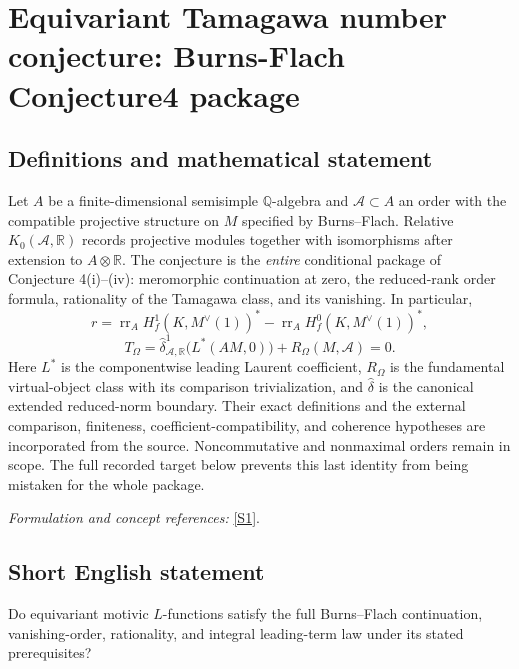 \documentclass[11pt]{article}
\begin{document}
\section*{\texorpdfstring{Equivariant Tamagawa number conjecture: Burns-Flach Conjecture4 package}{Equivariant Tamagawa number conjecture: Burns-Flach Conjecture4 package}}\label{statement}
\subsection{Definitions and mathematical statement}
Let $A$ be a finite-dimensional semisimple ${\mathbb{Q}}$-algebra and $\mathcal A\subset A$ an order with the compatible projective structure on $M$ specified by Burns--Flach. Relative $K_0(\mathcal A,{\mathbb{R}})$ records projective modules together with isomorphisms after extension to $A\otimes{\mathbb{R}}$. The conjecture is the \emph{entire} conditional package of Conjecture 4(i)--(iv): meromorphic continuation at zero, the reduced-rank order formula, rationality of the Tamagawa class, and its vanishing. In particular,
\[
 r=\operatorname{rr}_A H_f^1(K,M^\vee(1))^*
   -\operatorname{rr}_A H_f^0(K,M^\vee(1))^*,
\]
\[
 T_\Omega=\widehat\delta^1_{\mathcal A,{\mathbb{R}}}\bigl(L^*(AM,0)\bigr)
             +R_\Omega(M,\mathcal A)=0.
\]
Here $L^*$ is the componentwise leading Laurent coefficient, $R_\Omega$ is the fundamental virtual-object class with its comparison trivialization, and $\widehat\delta$ is the canonical extended reduced-norm boundary. Their exact definitions and the external comparison, finiteness, coefficient-compatibility, and coherence hypotheses are incorporated from the source. Noncommutative and nonmaximal orders remain in scope. The full recorded target below prevents this last identity from being mistaken for the whole package.
\par\smallskip\textit{Formulation and concept references:} \href{https://ems.press/content/serial-article-files/25892}{[S1]}.

\subsection{Short English statement}
Do equivariant motivic $L$-functions satisfy the full Burns--Flach continuation, vanishing-order, rationality, and integral leading-term law under its stated prerequisites?
\end{document}
